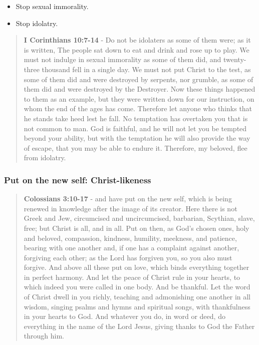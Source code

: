 \documentclass[11pt]{article}
\begin{document}
\begin{itemize}
\item Stop sexual immorality.
\item Stop idolatry.
\end{itemize}

\begin{quote}
\textbf{I Corinthians 10:7-14} - Do not be idolaters as some of them were; as it is written, The people sat down to eat and drink and rose up to play. We must not indulge in sexual immorality as some of them did, and twenty-three thousand fell in a single day. We must not put Christ to the test, as some of them did and were destroyed by serpents, nor grumble, as some of them did and were destroyed by the Destroyer. Now these things happened to them as an example, but they were written down for our instruction, on whom the end of the ages has come. Therefore let anyone who thinks that he stands take heed lest he fall. No temptation has overtaken you that is not common to man. God is faithful, and he will not let you be tempted beyond your ability, but with the temptation he will also provide the way of escape, that you may be able to endure it. Therefore, my beloved, flee from idolatry.
\end{quote}

\subsubsection{Put on the new self: Christ-likeness}
\label{sec:org48608d5}
\begin{quote}
\textbf{Colossians 3:10-17} - and have put on the new self, which is being renewed in knowledge after the image of its creator. Here there is not Greek and Jew, circumcised and uncircumcised, barbarian, Scythian, slave, free; but Christ is all, and in all. Put on then, as God's chosen ones, holy and beloved, compassion, kindness, humility, meekness, and patience, bearing with one another and, if one has a complaint against another, forgiving each other; as the Lord has forgiven you, so you also must forgive. And above all these put on love, which binds everything together in perfect harmony. And let the peace of Christ rule in your hearts, to which indeed you were called in one body. And be thankful. Let the word of Christ dwell in you richly, teaching and admonishing one another in all wisdom, singing psalms and hymns and spiritual songs, with thankfulness in your hearts to God. And whatever you do, in word or deed, do everything in the name of the Lord Jesus, giving thanks to God the Father through him.
\end{quote}
\end{document}
